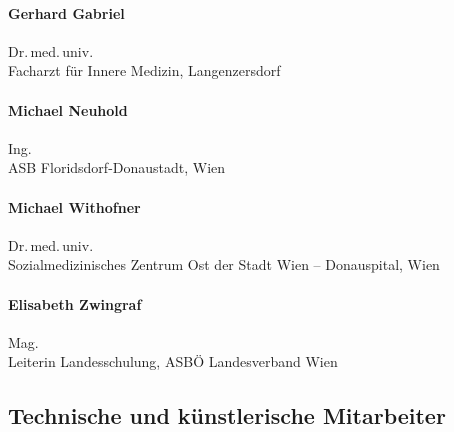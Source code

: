 \begin{raggedright}
  \begin{minipage}{\linewidth}\raggedright
    \paragraph{Gerhard Gabriel}
    Dr.\,med.\,univ. \\[.25\baselineskip]
    Facharzt für Innere Medizin, Langenzersdorf
  \end{minipage}




  \bigskip

  \begin{minipage}{\linewidth}\raggedright
    \paragraph{Michael Neuhold}
    Ing.\\[.25\baselineskip]
    {\color{AltBlueDark}ASB Florids\-dorf-Donau\-stadt},
    Wien
  \end{minipage}

  \bigskip

  \begin{minipage}{\linewidth}\raggedright
    \paragraph{Michael Withofner}
    Dr.\,med.\,univ.\\[.25\baselineskip]
    {\color{AltBlueDark}Sozialmedizinisches Zentrum Ost der Stadt Wien --
    Donauspital}, Wien
  \end{minipage}

  \bigskip

  \begin{minipage}{\linewidth}\raggedright
    \paragraph{Elisabeth Zwingraf}
    Mag. \\[.25\baselineskip]
    Leiterin Landesschulung, {\color{AltBlueDark}ASBÖ Landesverband 
    Wien}
  \end{minipage}




\clearpage %
\subsection*{Technische und künstlerische Mitarbeiter}



\end{raggedright}
